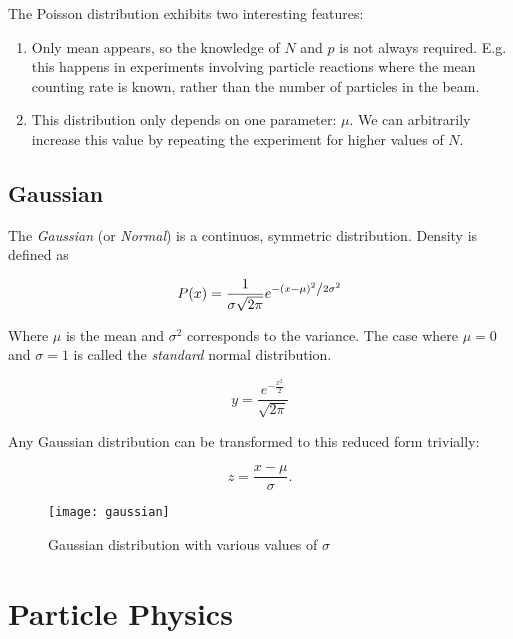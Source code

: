 The Poisson distribution exhibits two interesting features:

\begin{enumerate}
	\item Only mean appears, so the knowledge of $N$ and $p$ is not always required. E.g. this happens in experiments involving particle reactions where the mean counting rate is known, rather than the number of particles in the beam.

	\item This distribution only depends on one parameter: $\mu$. We can arbitrarily increase this value by repeating the experiment for higher values of $N$.
\end{enumerate}

\subsection{Gaussian}
\label{eqn:gaussian}


The \textit{Gaussian} (or \textit{Normal}) is a continuos, symmetric distribution. Density is defined as

\begin{equation}
	P(x) = \frac{1}{{\sigma \sqrt {2\pi } }}e^{{{ - \left( {x - \mu } \right)^2 } \mathord{\left/ {\vphantom {{ - \left( {x - \mu } \right)^2 } {2\sigma ^2 }}} \right. \kern-\nulldelimiterspace} {2\sigma ^2 }}}
\end{equation}

Where $\mu$ is the mean and $\sigma ^2$ corresponds to the variance. The case where $\mu = 0$ and $\sigma = 1$ is called the \textit{standard} normal distribution.

\begin{equation}
	y = \frac{e^{ - \frac{{x^2 }}{2}}}{{\sqrt {2\pi } }}
\end{equation}

Any Gaussian distribution can be transformed to this reduced form trivially:

\begin{equation}
	z = \frac{x-\mu}{\sigma}.
\end{equation}

\begin{figure}
	\centerline{
		\texttt{[image: gaussian]}}
	\caption{Gaussian distribution with various values of $\sigma$ \cite{leo2012techniques}}
\end{figure}

\section{Particle Physics}

